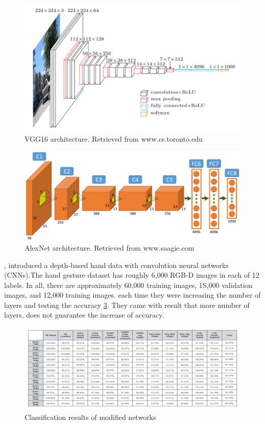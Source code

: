 \documentclass[12pt]{report}
\begin{document}
\begin{figure}[h]
    \centering
    \includegraphics[width=.9\textwidth]{images/vgg16.png}
    \caption{VGG16 architecture. Retrieved from www.cs.toronto.edu}
    \label{fig:vgg16}
\end{figure}
\begin{figure}[h]
    \centering
    \includegraphics[width=.8\textwidth]{images/alexnet.png}
    \caption{AlexNet architecture. Retrieved from www.saagie.com}
    \label{fig:alexnet}
\end{figure}


\clearpage

\cite{Pyo2016}, introduced a depth-based hand data with convolution
neural networks (CNNs).The hand gesture dataset has roughly 6,000 RGB-D 
images in each of 12 labels. In all, there are approximately 60,000
training images, 1S,000 validation images, and 12,000 training images.
each time they were increasing the number of layers and testing the 
accuracy \ref{fig:depth_cnn}.
They came with result that more number of layers, does not guarantee 
the increase of accuracy.
\bigbreak

\begin{figure}[h]
    \centering
    \includegraphics[width=\textwidth]{images/depth_cnn.png}
    \caption{Classification results of modified networks}
    \label{fig:depth_cnn}
\end{figure}
\end{document}
